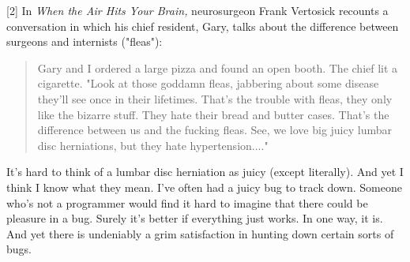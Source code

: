 [2] In
                  \emph{When the Air Hits Your Brain,} neurosurgeon Frank
                  Vertosick recounts a conversation in which his chief resident,
                  Gary, talks about the difference between surgeons and
                  internists ("fleas"):
                  \begin{quote}

                    Gary and I ordered a large pizza and found an open booth.
                    The chief lit a cigarette. "Look at those goddamn fleas,
                    jabbering about some disease they'll see once in their
                    lifetimes. That's the trouble with fleas, they only like the
                    bizarre stuff. They hate their bread and butter cases.
                    That's the difference between us and the fucking fleas. See,
                    we love big juicy lumbar disc herniations, but they hate
                    hypertension...."
                  
\end{quote}

                  It's hard to think of a lumbar disc herniation as juicy
                  (except literally). And yet I think I know what they mean.
                  I've often had a juicy bug to track down. Someone who's not a
                  programmer would find it hard to imagine that there could be
                  pleasure in a bug. Surely it's better if everything just
                  works. In one way, it is. And yet there is undeniably a grim
                  satisfaction in hunting down certain sorts of bugs.


              
            
          
